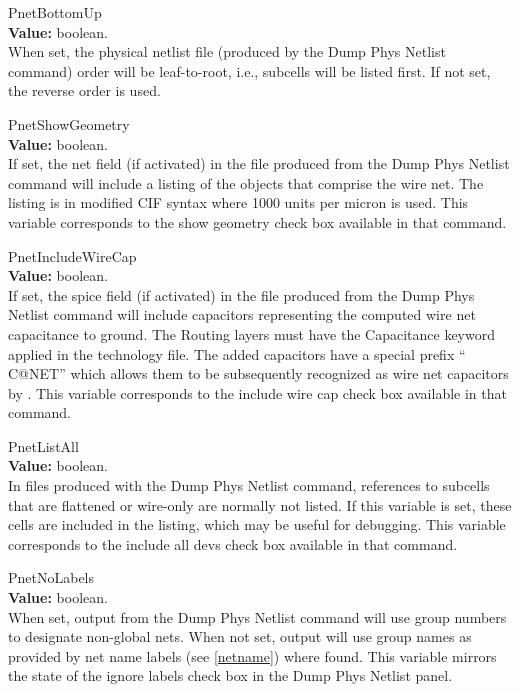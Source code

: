 \begin{description}
\item{\et PnetBottomUp}\\
{\bf Value:} boolean.\\
When set, the physical netlist file (produced by the {\cb Dump Phys
Netlist} command) order will be leaf-to-root, i.e., subcells will be
listed first.  If not set, the reverse order is used.

\item{\et PnetShowGeometry}\\
{\bf Value:} boolean.\\
If set, the {\et net} field (if activated) in the file produced from
the {\cb Dump Phys Netlist} command will include a listing of the
objects that comprise the wire net.  The listing is in modified CIF
syntax where 1000 units per micron is used.  This variable corresponds
to the {\et show geometry} check box available in that command.

\item{\et PnetIncludeWireCap}\\
{\bf Value:} boolean.\\
If set, the {\et spice} field (if activated) in the file produced from
the {\cb Dump Phys Netlist} command will include capacitors
representing the computed wire net capacitance to ground.  The {\et
Routing} layers must have the {\et Capacitance} keyword applied in the
technology file.  The added capacitors have a special prefix ``{\vt
C@NET}'' which allows them to be subsequently recognized as wire net
capacitors by {\Xic}.  This variable corresponds to the {\et include
wire cap} check box available in that command.

\item{\et PnetListAll}\\
{\bf Value:} boolean.\\
In files produced with the {\cb Dump Phys Netlist} command, references
to subcells that are flattened or wire-only are normally not listed. 
If this variable is set, these cells are included in the listing,
which may be useful for debugging.  This variable corresponds to the
{\et include all devs} check box available in that command.

\item{\et PnetNoLabels}\\
{\bf Value:} boolean.\\
When set, output from the {\cb Dump Phys Netlist} command will use
group numbers to designate non-global nets.  When not set, output will
use group names as provided by net name labels (see \ref{netname})
where found.  This variable mirrors the state of the {\cb ignore
labels} check box in the {\cb Dump Phys Netlist} panel.


\end{description}
